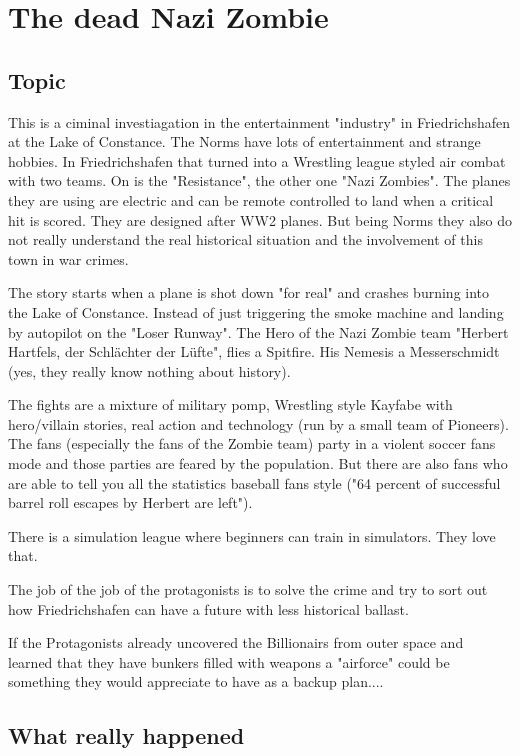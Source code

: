 \chapter{The dead Nazi Zombie}
\label{ch:The Dead Nazi Zombie}

\section{Topic}

This is a ciminal investiagation in the entertainment "industry" in Friedrichshafen at the Lake of Constance.
The Norms have lots of entertainment and strange hobbies. In Friedrichshafen that turned into a Wrestling league styled air combat with two teams. On is the "Resistance", the other one "Nazi Zombies".
The planes they are using are electric and can be remote controlled to land when a critical hit is scored. They are designed after WW2 planes.
But being Norms they also do not really understand the real historical situation and the involvement of this town in war crimes.

The story starts when a plane is shot down "for real" and crashes burning into the Lake of Constance. Instead of just triggering the smoke machine and landing by autopilot on the "Loser Runway".
The Hero of the Nazi Zombie team "Herbert Hartfels, der Schlächter der Lüfte", flies a Spitfire.
His Nemesis a Messerschmidt (yes, they really know nothing about history).

The fights are a mixture of military pomp, Wrestling style Kayfabe with hero/villain stories, real action and technology (run by a small team of Pioneers).
The fans (especially the fans of the Zombie team) party in a violent soccer fans mode and those parties are feared by the population. But there are also fans who are able to tell you all the statistics baseball fans style ("64 percent of successful barrel roll escapes by Herbert are left").

There is a simulation league where beginners can train in simulators. They love that.

The job of the job of the protagonists is to solve the crime and try to sort out how Friedrichshafen can have a future with less historical ballast.

If the Protagonists already uncovered the Billionairs from outer space and learned that they have bunkers filled with weapons a "airforce" could be something they would appreciate to have as a backup plan....

\section{What really happened}


